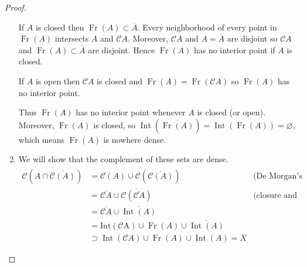 \begin{proof}
\begin{enumerate}[label={(\arabic*)},itemsep=0pt,leftmargin=*]
              If \(A\) is closed then \( \operatorname{Fr}(A) \subset \overline{A} \). Every neighborhood of every point in \( \operatorname{Fr}(A) \) intersects \(A\) and \(\mathscr{C}A\). Moreover, \( \mathscr{C}A \) and \( A = \overline{A} \) are disjoint so \( \mathscr{C}A \) and \( \operatorname{Fr}(A) \subset \overline{A} \) are disjoint. Hence \( \operatorname{Fr}(A) \) has no interior point if \(A\) is closed.

              If \(A\) is open then \(\mathscr{C}A\) is closed and \(\operatorname{Fr}(A) = \operatorname{Fr}(\mathscr{C}A)\) so \( \operatorname{Fr}(A) \) has no interior point.

              Thus \( \operatorname{Fr}(A) \) has no interior point whenever \(A\) is closed (or open). Moreover, \( \operatorname{Fr}(A) \) is closed, so \( \operatorname{Int}(\overline{\operatorname{Fr}(A)}) = \operatorname{Int}(\operatorname{Fr}(A)) = \varnothing \), which means \( \operatorname{Fr}(A) \) is nowhere dense.
        \item We will show that the complement of these sets are dense.
              \begingroup
              \allowdisplaybreaks%
              \begin{align*}
                  \overline{\mathscr{C}(A \cap \overline{\mathscr{C}(A)})} & = \overline{\mathscr{C}(A) \cup \mathscr{C}(\overline{\mathscr{C}(A)})}                            & \text{(De Morgan's law)}                   \\
                                                                           & = \overline{\mathscr{C}A} \cup \overline{\mathscr{C}(\overline{\mathscr{C}A})}                     & \text{(closure and union are commutative)} \\
                                                                           & = \overline{\mathscr{C}A} \cup \overline{\operatorname{Int}(A)}                                                                                 \\
                                                                           & = \operatorname{Int(\mathscr{C}A)} \cup \operatorname{Fr}(A) \cup \overline{\operatorname{Int}(A)}                                              \\
                                                                           & \supset \operatorname{Int}(\mathscr{C}A) \cup \operatorname{Fr}(A) \cup \operatorname{Int}(A) = X
              \end{align*}
              \endgroup


\end{enumerate}
\end{proof}
